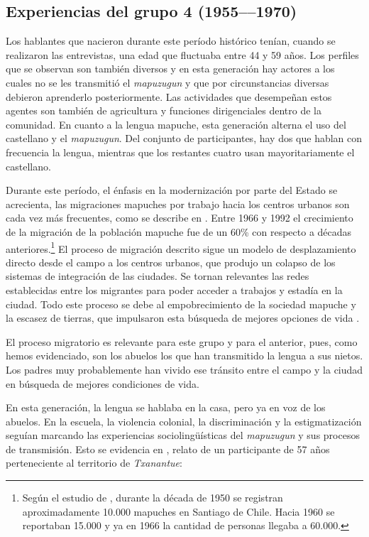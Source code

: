 \documentclass[output=paper]{../langscibook}
\begin{document}
\subsection{Experiencias del grupo 4 (1955––1970)}



Los hablantes que nacieron durante este período histórico tenían, cuando se realizaron las entrevistas, una edad que fluctuaba entre 44 y 59 años. Los perfiles que se observan son también diversos y en esta generación hay actores a los cuales no se les transmitió el \textit{mapuzugun} y que por circunstancias diversas debieron aprenderlo posteriormente. Las actividades que desempeñan estos agentes son también de agricultura y funciones dirigenciales dentro de la comunidad. En cuanto a la lengua mapuche, esta generación alterna el uso del castellano y el \textit{mapuzugun}. Del conjunto de participantes, hay dos que hablan con frecuencia la lengua, mientras que los restantes cuatro usan mayoritariamente el castellano. 

Durante este período, el énfasis en la modernización por parte del Estado se acrecienta, las migraciones mapuches por trabajo hacia los centros urbanos son cada vez más frecuentes, como se describe en \citet{ImilanÁlvarez2007}. Entre 1966 y 1992 el crecimiento de la migración de la población mapuche fue de un 60\% con respecto a décadas anteriores.\footnote{Según el estudio de \citet{ImilanÁlvarez2007}, durante la década de 1950 se registran aproximadamente 10.000 mapuches en Santiago de Chile. Hacia 1960 se reportaban 15.000 y ya en 1966 la cantidad de personas llegaba a 60.000.} El proceso de migración descrito sigue un modelo de desplazamiento directo desde el campo a los centros urbanos, que produjo un colapso de los sistemas de integración de las ciudades. Se tornan relevantes las redes establecidas entre los migrantes para poder acceder a trabajos y estadía en la ciudad. Todo este proceso se debe al empobrecimiento de la sociedad mapuche y la escasez de tierras, que impulsaron esta búsqueda de mejores opciones de vida \citealt{ImilanÁlvarez2007}.

El proceso migratorio es relevante para este grupo y para el anterior, pues, como hemos evidenciado, son los abuelos los que han transmitido la lengua a sus nietos. Los padres muy probablemente han vivido ese tránsito entre el campo y la ciudad en búsqueda de mejores condiciones de vida. 

En esta generación, la lengua se hablaba en la casa, pero ya en voz de los abuelos. En la escuela, la violencia colonial, la discriminación y la estigmatización seguían marcando las experiencias sociolingüísticas del \textit{mapuzugun} y sus procesos de transmisión. Esto se evidencia en , relato de un participante de 57 años perteneciente al territorio de \textit{Txanantue}:
\end{document}
